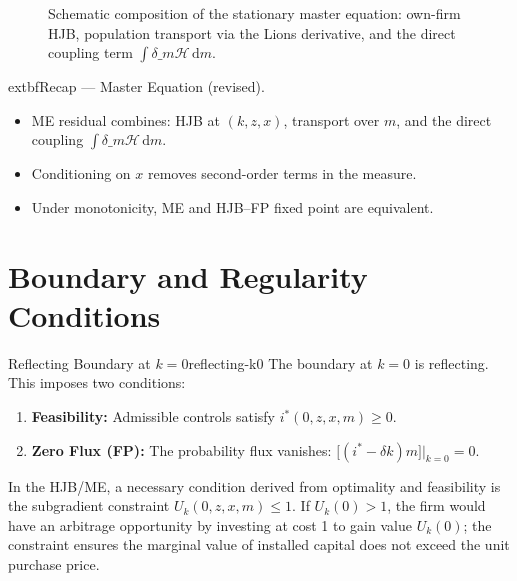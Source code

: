 ﻿\documentclass[11pt,letterpaper,oneside]{article}
\numberwithin{equation}{section}
\newcommand{\1}{\mathbf{1}}
\newcommand{\Dm}{D\_m}
\begin{document}
\begin{figure}[ht]
\centering
{}
\label{fig:me_schematic}
\caption{Schematic composition of the stationary master equation: own-firm HJB, population transport via the Lions derivative, and the direct coupling term $\int \delta\_m \mathcal H\,\mathrm dm$.}
\end{figure}

\begin{tcolorbox}[didacticstyle]
  	extbf{Recap --- Master Equation (revised).}
\begin{itemize}[leftmargin=1.15em,itemsep=0.2em]
  \item ME residual combines: HJB at $(k,z,x)$, transport over $m$, and the direct coupling $\int \delta\_m \mathcal H\,\mathrm dm$.
  \item Conditioning on $x$ removes second-order terms in the measure.
  \item Under monotonicity, ME and HJB--FP fixed point are equivalent.
\end{itemize}
\end{tcolorbox}

\section{Boundary and Regularity Conditions}
\label{sec:boundary-regularity}

\begin{definition}{Reflecting Boundary at $k=0$}{reflecting-k0}
The boundary at $k=0$ is reflecting. This imposes two conditions:
\begin{enumerate}[label=(\roman*),itemsep=0.25em]
    \item \textbf{Feasibility:} Admissible controls satisfy $i^*(0,z,x,m)\ge 0$.
    \item \textbf{Zero Flux (FP):} The probability flux vanishes: $\big[(i^*-\delta k)m\big]\big|_{k=0}=0$.
\end{enumerate}
In the HJB/ME, a necessary condition derived from optimality and feasibility is the subgradient constraint $U_k(0,z,x,m)\le 1$. If $U_k(0)>1$, the firm would have an arbitrage opportunity by investing at cost 1 to gain value $U_k(0)$; the constraint ensures the marginal value of installed capital does not exceed the unit purchase price.
\end{definition}
\end{document}
